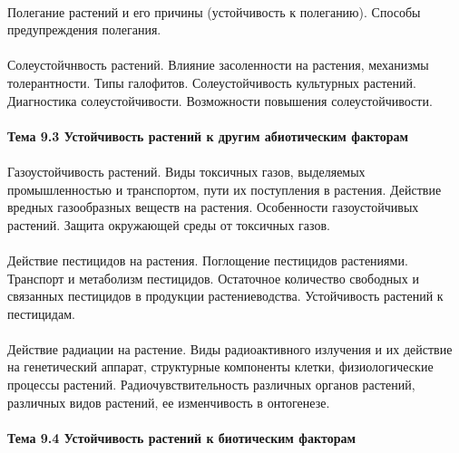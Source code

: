 \paragraph*{}Полегание растений и его причины (устойчивость к полеганию). Способы предупреждения полегания.

\paragraph*{}Солеустойчнвость растений. Влияние засоленности на растения, механизмы толерантности. Типы галофитов. Солеустойчивость культурных растений. Диагностика солеустойчивости. Возможности повышения солеустойчивости.

\paragraph*{Тема 9.3 Устойчивость растений к другим абиотическим факторам}

\paragraph*{}Газоустойчивость растений. Виды токсичных газов, выделяемых промышленностью и транспортом, пути их поступления в растения. Действие вредных газообразных веществ на растения. Особенности газоустойчивых растений. Защита окружающей среды от токсичных газов.

\paragraph*{}Действие пестицидов на растения. Поглощение пестицидов растениями. Транспорт и метаболизм пестицидов. Остаточное количество свободных и связанных пестицидов в продукции растениеводства. Устойчивость растений к пестицидам.

\paragraph*{}Действие радиации на растение. Виды радиоактивного излучения и их действие на генетический аппарат, структурные компоненты клетки, физиологические процессы растений. Радиочувствительность различных органов растений, различных видов растений, ее изменчивость в онтогенезе.

\paragraph*{Тема 9.4 Устойчивость растений к биотическим факторам}

